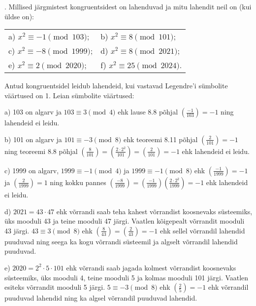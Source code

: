 \documentclass[a4paper, 10pt]{article}
\newcommand{\leg}[2]{\left(\frac{#1}{#2}\right)}
\begin{document}
\bigskip

\pagebreak

. Millised järgmistest kongruentsidest on lahenduvad ja mitu lahendit neil on (kui üldse on):

\begin{tabular}{p{6cm}p{6cm}}
a) $x^2\equiv -1 \pmod{103}$;&b) $x^2\equiv 8 \pmod{101}$;\\
c) $x^2\equiv -8 \pmod{1999}$;&d) $x^2\equiv 8 \pmod{2021}$;\\
e) $x^2\equiv 2 \pmod{2020}$;&f) $x^2\equiv 25 \pmod{2024}$.\\
\end{tabular}

\bigskip
Antud kongruentsidel leidub lahendeid, kui vastavad Legendre'i sümbolite väärtused on 1. Leian sümbolite väärtused:

a) 103 on algarv ja $103\equiv3\pmod4$ ehk lause 8.8 põhjal $\leg {-1}{103}=-1$ ning lahendeid ei leidu.

b) 101 on algarv ja $101\equiv-3\pmod8$ ehk teoreemi 8.11 põhjal $\leg {2}{101}=-1$ ning teoreemi 8.8 põhjal $\leg {8}{101}=\leg {2\cdot2^2}{101}=\leg {2}{101}=-1$ ehk lahendeid ei leidu.

c) 1999 on algarv, $1999\equiv-1\pmod4$ ja $1999\equiv-1\pmod8$ ehk $\leg {-1}{1999}=-1$ ja $\leg {2}{1999}=1$ ning kokku pannes $\leg{-8}{1999}=\leg{-1}{1999}\leg{2\cdot2^2}{1999}=-1$ ehk lahendeid ei leidu.

d) $2021=43\cdot47$ ehk võrrandi saab teha kahest võrrandist koosnevaks süsteemiks, üks mooduli 43 ja teine mooduli 47 järgi. Vaatlen kõigepealt võrrandit mooduli 43 järgi. $43\equiv3\pmod8$ ehk \mbox{$\leg8{43}=\leg2{43}=-1$} ehk sellel võrrandil lahendid puuduvad ning seega ka kogu võrrandi süsteemil ja algselt võrrandil lahendid puuduvad.

e) $2020=2^2\cdot5\cdot101$ ehk võrrandi saab jagada kolmest võrrandist koosnevaks süsteemiks, üks mooduli 4, teine mooduli 5 ja kolmas mooduli 101 järgi. Vaatlen esiteks võrrandit mooduli 5 järgi. $5\equiv-3\pmod8$ ehk $\leg 25=-1$ ehk võrrandil puuduvad lahendid ning ka algsel võrrandil puuduvad lahendid.
\end{document}
